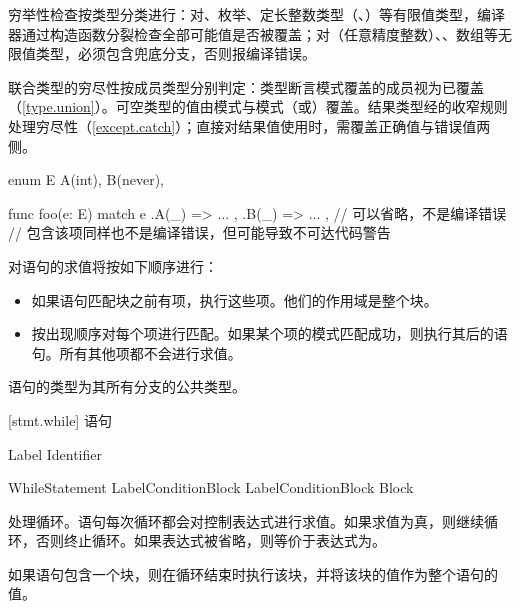 \pnum
穷举性检查按类型分类进行：对、枚举、定长整数类型（、）等有限值类型，编译器通过构造函数分裂检查全部可能值是否被覆盖；对（任意精度整数）、、数组等无限值类型，必须包含\tcode{_}兜底分支，否则报编译错误。

\pnum
联合类型的穷尽性按成员类型分别判定：类型断言模式覆盖的成员视为已覆盖（\ref{type.union}）。可空类型的值由模式与模式（或\tcode{_}）覆盖。结果类型经的收窄规则处理穷尽性（\ref{except.catch}）；直接对结果值使用时，需覆盖正确值与错误值两侧。

\enterexample
\begin{codeblock}

enum E {
    A(int),
    B(never),
}

func foo(e: E) {
    match e {
        .A(_) => { ... },
        .B(_) => { ... }, // 可以省略，不是编译错误
                          // 包含该项同样也不是编译错误，但可能导致不可达代码警告
    }
}

\end{codeblock}
\exitexample

\pnum
对语句的求值将按如下顺序进行：

\begin{itemize}
    \item 如果语句匹配块之前有项，执行这些项。他们的作用域是整个块。
    \item 按出现顺序对每个项进行匹配。如果某个项的模式匹配成功，则执行其后的语句。所有其他项都不会进行求值。
\end{itemize}

语句的类型为其所有分支的公共类型。

[stmt.while]{ 语句}

\begin{bnf}{Label}
     Identifier
\end{bnf}

\begin{bnf}{WhileStatement}
     Label\bnfq Condition\bnfq Block \br
     Label\bnfq Condition\bnfq Block  Block
\end{bnf}

\pnum
{}处理循环。语句每次循环都会对控制表达式进行求值。如果求值为真，则继续循环，否则终止循环。如果表达式被省略，则等价于表达式为。

\pnum
如果语句包含一个块，则在循环结束时执行该块，并将该块的值作为整个语句的值。

